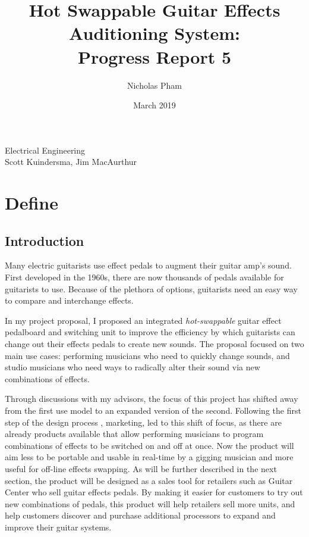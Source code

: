 \documentclass{article}
\title{Hot Swappable Guitar Effects Auditioning System:\\Progress Report 5}
\author{Nicholas Pham}
\date{March 2019}
\begin{document}
\maketitle
\begin{center}
    Electrical Engineering \\
    Scott Kuindersma, Jim MacAurthur
\end{center}

\newpage
\glsaddall
\printglossaries
\newpage


\color{gray}
\section{Define}
	\subsection{Introduction}
	
	Many electric guitarists use effect pedals to augment their guitar amp's sound.  First developed in the 1960s, there are now thousands of pedals available for guitarists to use.  Because of the plethora of options, guitarists need an easy way to compare and interchange effects.

	In my project proposal, I proposed an integrated \emph{hot-swappable} guitar effect pedalboard and switching unit to improve the efficiency by which guitarists can change out their effects pedals to create new sounds.  The proposal focused on two main use cases: performing musicians who need to quickly change sounds, and studio musicians who need ways to radically alter their sound via new combinations of effects.

	Through discussions with my advisors, the focus of this project has shifted away from the first use model to an expanded version of the second.  Following the first step of the design process \cite{ES100Lec3}, marketing, led to this shift of focus, as there are already products available that allow performing musicians to program combinations of effects to be switched on and off at once.  Now the product will aim less to be portable and usable in real-time by a gigging musician and more useful for off-line effects swapping.  As will be further described in the next section, the product will be designed as a sales tool for retailers such as Guitar Center who sell guitar effects pedals.  By making it easier for customers to try out new combinations of pedals, this product will help retailers sell more units, and help customers discover and purchase additional processors to expand and improve their guitar systems.
	
\end{document}

